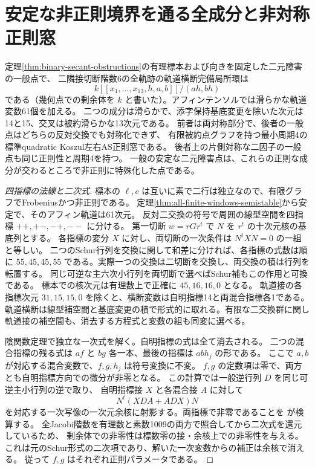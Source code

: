 \section{安定な非正則境界を通る全成分と非対称正則窓}
\label{sec:binary-component-crossing}
\begin{theorem}\label{thm:binary-component-crossing}
定理\ref{thm:binary-secant-obstructions}の有理標本および向きを固定した二元障害の一般点で、
二隣接切断階数6の全軌跡の軌道横断完備局所環は
\[
                  k[[x_1,\ldots,x_{13},h,a,b]]/(ah,bh)
\]
である（幾何点での剰余体を $k$ と書いた）。アフィンテンソルでは滑らかな軌道変数61個を加える。
二つの成分は滑らかで、添字保持基底変更を除いた次元は14と15、交叉は被約滑らかな13次元である。
前者は両対称部分で、後者の一般点はどちらの反対交換でも対称化できず、
有限被約点グラフを持つ最小周期4の標準quadratic Koszul左右AS正則窓である。
後者上の片側対称な二因子の一般点も同じ正則性と周期4を持つ。
一般の安定な二元障害点は、これらの正則な成分が交わるところで非正則に特殊化した点である。
\end{theorem}
\begin{proof}[四指標の法線と二次式]
標本の $\ell,c$ は互いに素で二行は独立なので、有限グラフでFrobeniusかつ非正則である。
定理\ref{thm:all-finite-windows-semistable}から安定で、そのアフィン軌道は61次元。
反対二交換の符号で周囲の線型空間を四指標 $++,+-,-+,--$ に分ける。
第一切断 $w=rGr^t$ で $N$ を $r^t$ の十次元核の基底列とする。
各指標の変分 $X$ に対し、両切断の一次条件は $N^tXN=0$ の一組と等しい。
二つのSchur行列を交換に関して和差に分ければ、各指標の式数は順に
$55,45,45,55$ である。実際一つの交換は二切断を交換し、両交換の積は行列を転置する。
同じ可逆な主六次小行列を両切断で選べばSchur補もこの作用と可換である。
標本での核次元は有理数上で正確に $45,16,16,0$ となる。
軌道接の各指標次元 $31,15,15,0$ を除くと、横断変数は自明指標14と両混合指標各1である。
軌道横断は線型補空間と基底変更の積で形式的に取れる。有限な二交換群に関し
軌道接の補空間も、消去する方程式と変数の組も同変に選べる。

陰関数定理で独立な一次式を解く。自明指標の式は全て消去される。
二つの混合指標の残る式は $af$ と $bg$ 各一本、最後の指標は $ab h_j$ の形である。
ここで $a,b$ が対応する混合変数で、$f,g,h_j$ は符号変換に不変。
$f,g$ の定数項は零で、両方とも自明指標方向での微分が非零となる。
この計算では一般逆行列 $D$ を同じ可逆主小行列の逆で取り、
自明指標接 $X$ と各混合接 $A$ に対して
\[
              N^t(XDA+ADX)N
\]
を対応する一次写像の一次元余核に射影する。両指標で非零であることを
が検算する。
全Jacobi階数を有理数と素数1009の両方で照合してから二次式を還元しているため、
剰余体での非零性は標数零の接・余核上での非零性を与える。
これは元のSchur形式の二次項であり、解いた一次変数からの補正は余核で消える。
従って $f,g$ はそれぞれ正則パラメータである。
\end{proof}
